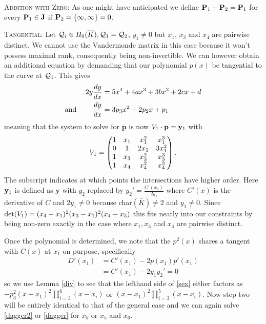\documentclass[english,11pt,a4paper]{article}
\begin{document}
\begin{case}
  {\scshape Addition with Zero:} As one might have anticipated we define $\P_1 + \P_2 = \P_1$ for every $\P_1 \in \J$ if $\P_2 = \{\infty, \infty\} = 0$.
\end{case}

\setcounter{case}{1}
\begin{case}
	{\scshape Tangential:} Let $\q_i\in \enkb, \q_1 = \q_2$, $y_1 \neq 0$ but $x_1$, $x_3$ and $x_4$ are pairwise distinct. We cannot use the Vandermonde matrix in this case because it won't possess maximal rank, consequently being non-invertible. We can however obtain an additional equation by demanding that our polynomial $p(x)$ be tangential to the curve at $\q_1$. This gives
	\begin{align*}
	  2 y \frac{dy}{dx} &= 5  x^4 + 4 a x^3 + 3 b x^2 + 2 c x + d \\
	  \text{and\hspace{8mm}} \frac{dy}{dx} &= 3 p_3 x^2 + 2 p_2 x + p_1
	\end{align*}
	meaning that the system to solve for $\mathbf{p}$ is now $\Vdoub \cdot \mathbf{p} = \ydoub$ with
	\begin{align*}\Vdoub=
		\begin{pmatrix}
			1 & x_1 & x_1^2 & x_1^3\\
			0 & 1 & 2 x_1 & 3 x_1^2\\
			1 & x_3 & x_3^2 & x_3^3\\
			1 & x_4 & x_4^2 & x_4^3\\
		\end{pmatrix}.
	\end{align*}
	The subscript indicates at which points the intersections have higher order.
	Here $\ydoub$ is defined as $\mathbf{y}$ with $y_2$ replaced by $y_2'=\frac{C'(x_1)}{2 y_1}$ where $C'(x)$ is the derivative of $C$ and $2y_1 \neq 0$ because char$(\bar K) \neq 2$ and $y_1\neq 0$. Since $\det(\Vdoub) = (x_4-x_1)^2(x_3-x_1)^2(x_4-x_3)$ this fits neatly into our constraints by being non-zero exactly in the case where $x_1, x_3$ and $x_4$ are pairwise distinct.

	Once the polynomial is determined, we note that the $p^2(x)$ shares a tangent with $C(x)$ at $x_1$ on purpose, specifically
	\begin{align*}
	  D'(x_1) &= C'(x_1) - 2 p(x_1)p'(x_1)\\
	  				&= C'(x_1) - 2 y_1 y_2' = 0
	\end{align*}
	so we use Lemma \ref{div} to see that the lefthand side of \eqref{sex} either factors as $-p_3^2(x-x_1)^2\prod_{i=3}^6(x-x_i)$ or $(x-x_1)^2\prod_{i=3}^5(x-x_i)$. Now step two will be entirely identical to that of the general case and we can again solve \eqref{dagger2} or \eqref{dagger} for $x_5$ or $x_5$ and $x_6$.
\end{case}
\end{document}
